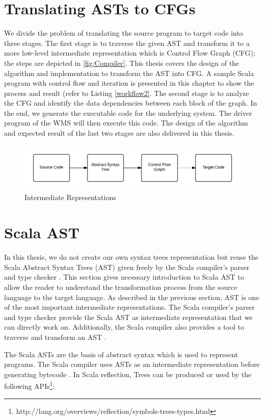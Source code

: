 \section{Translating ASTs to CFGs}
We divide the problem of translating the source program to target code into three stages. The first stage is to traverse the given AST and transform it to a more low-level intermediate representation which is Control Flow Graph (CFG); the steps are depicted in \autoref{fig:Compiler}. This thesis covers the design of the algorithm and implementation to transform the AST into CFG. A sample Scala program with control flow and iteration is presented in this chapter to show the process and result (refer to Listing \ref{workflow2}. The second stage is to analyze the CFG and identify the data dependencies between each block of the graph. In the end, we generate the executable code for the underlying system. The driver program of the WMS will then execute this code. The design of the algorithm and expected result of the last two stages are also delivered in this thesis. 

\begin{figure}[h!]
\centering
\includegraphics[width=0.8\linewidth]{figures/CompStructure}
\caption{Intermediate Representations}
\label{fig:Compiler}
\end{figure}

\section{Scala AST}
In this thesis, we do not create our own syntax trees representation but reuse the Scala Abstract Syntax Trees (AST) given freely by the Scala compiler's parser and type checker \cite{stocker2010scala}. This section gives necessary introduction to Scala AST to allow the reader to understand the transformation process from the source language to the target language. As described in the previous section, AST is one of the most important intermediate representations. The Scala compiler's parser and type checker provide the Scala AST as intermediate representation that we can directly work on. Additionally, the Scala compiler also provides a tool to traverse and transform an AST \cite{stocker2010scala}.

The Scala ASTs are the basis of abstract syntax which is used to represent programs. The Scala compiler uses ASTs as an intermediate representation before generating bytecode \cite{demarne2014scala}. In Scala reflection, Trees can be produced or used by the following APIs\footnote{http://lang.org/overviews/reflection/symbols-trees-types.html}:

